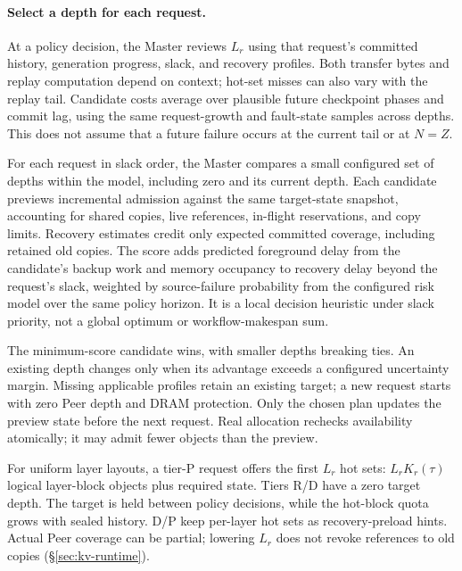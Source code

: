 \paragraph{Select a depth for each request.}
At a policy decision, the Master reviews $L_r$ using that request's
committed history, generation progress, slack, and recovery profiles.
Both transfer bytes and replay computation depend on context; hot-set
misses can also vary with the replay tail. Candidate costs average over
plausible future checkpoint phases and commit lag, using the same
request-growth and fault-state samples across depths. This does not
assume that a future failure occurs at the current tail or at $N=Z$.

For each request in slack order, the Master compares a small configured
set of depths within the model, including zero and its current depth. Each candidate
previews incremental admission against the same target-state snapshot,
accounting for shared copies, live references, in-flight reservations,
and copy limits. Recovery estimates credit only expected committed
coverage, including retained old copies. The score adds predicted
foreground delay from the candidate's backup work and memory occupancy
to recovery delay beyond the request's slack, weighted by source-failure
probability from the configured risk model over the same policy horizon. It is a local decision
heuristic under slack priority, not a global optimum or workflow-makespan sum.

The minimum-score candidate wins, with smaller depths breaking ties.
An existing depth changes only when its advantage exceeds a configured
uncertainty margin. Missing applicable profiles retain an existing target;
a new request starts with zero Peer depth and DRAM protection.
Only the chosen plan updates the preview state before the next request.
Real allocation rechecks availability atomically; it may admit fewer
objects than the preview.

For uniform layer layouts, a tier-P request offers the first $L_r$
hot sets: $L_rK_r(\tau)$ logical layer-block objects plus required state.
Tiers R/D have a zero target depth. The target is held between policy
decisions, while the hot-block quota grows with sealed history.
D/P keep per-layer hot sets as recovery-preload hints. Actual Peer
coverage can be partial; lowering $L_r$ does not revoke references to
old copies (\S\ref{sec:kv-runtime}).

